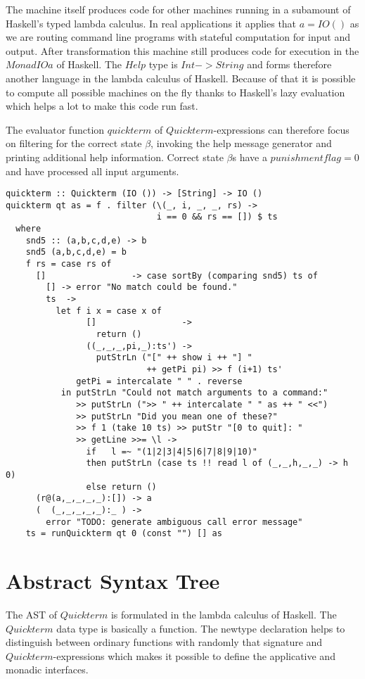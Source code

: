 \documentclass[a4paper]{article}
\begin{document}
The machine itself produces code for other machines running in a subamount of Haskell's typed lambda calculus. In real applications it applies that $a = IO ()$ as we are routing command line programs with stateful computation for input and output. After transformation this machine still produces code for execution in the $MonadIO a$ of Haskell. The $Help$ type is $Int -> String$ and forms therefore another language in the lambda calculus of Haskell. Because of that it is possible to compute all possible machines on the fly thanks to Haskell's lazy evaluation which helps a lot to make this code run fast.

The evaluator function $quickterm$ of $Quickterm$-expressions can therefore focus on filtering for the correct state $\beta$, invoking the help message generator and printing additional help information. Correct state $\beta$s have a $punishment flag = 0$ and have processed all input arguments.

\begin{lstlisting}
quickterm :: Quickterm (IO ()) -> [String] -> IO ()
quickterm qt as = f . filter (\(_, i, _, _, rs) ->
                              i == 0 && rs == []) $ ts
  where
    snd5 :: (a,b,c,d,e) -> b
    snd5 (a,b,c,d,e) = b
    f rs = case rs of
      []                 -> case sortBy (comparing snd5) ts of
        [] -> error "No match could be found."
        ts  ->
          let f i x = case x of
                []                 ->
                  return () 
                ((_,_,_,pi,_):ts') ->
                  putStrLn ("[" ++ show i ++ "] "
                            ++ getPi pi) >> f (i+1) ts'
              getPi = intercalate " " . reverse
           in putStrLn "Could not match arguments to a command:"
              >> putStrLn (">> " ++ intercalate " " as ++ " <<")
              >> putStrLn "Did you mean one of these?"
              >> f 1 (take 10 ts) >> putStr "[0 to quit]: "
              >> getLine >>= \l ->
                if   l =~ "(1|2|3|4|5|6|7|8|9|10)"
                then putStrLn (case ts !! read l of (_,_,h,_,_) -> h 0)
                else return ()
      (r@(a,_,_,_,_):[]) -> a
      (  (_,_,_,_,_):_ ) ->
        error "TODO: generate ambiguous call error message"
    ts = runQuickterm qt 0 (const "") [] as
\end{lstlisting}

\section{Abstract Syntax Tree}
The AST of $Quickterm$ is formulated in the lambda calculus of Haskell. The $Quickterm$ data type is basically a function. The newtype declaration helps to distinguish between ordinary functions with randomly that signature and $Quickterm$-expressions which makes it possible to define the applicative and monadic interfaces.
\end{document}
